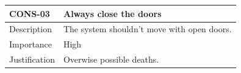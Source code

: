 \documentclass[a4paper,11pt]{article}
\begin{document}
\noindent\begin{tabularx}{\textwidth}{|C{2cm}|Y|}
  \hline
  \textbf{CONS-03} & \textbf{Always close the doors}\\
  \hline
  Description &
  The system shouldn't move with open doors.
  \\
  \hline
  Importance & High\\
  \hline
  Justification &
  Overwise possible deaths.
  \\
  \hline
\end{tabularx}
\end{document}
